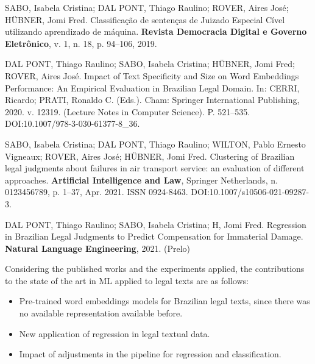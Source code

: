\begin{flushleft}

SABO, Isabela Cristina; DAL PONT, Thiago Raulino; ROVER, Aires José; HÜBNER, Jomi Fred. Classificação de sentenças de Juizado Especial Cível utilizando aprendizado de máquina. \textbf{Revista Democracia Digital e Governo Eletrônico}, v. 1, n. 18, p. 94–106, 2019.

\vspace{1em}

DAL PONT, Thiago Raulino; SABO, Isabela Cristina; HÜBNER, Jomi Fred; ROVER, Aires José. Impact of Text Specificity and Size on Word Embeddings Performance: An Empirical Evaluation in Brazilian Legal Domain. In: CERRI, Ricardo; PRATI, Ronaldo C. (Eds.). Cham: Springer International Publishing, 2020. v. 12319. (Lecture Notes in Computer Science). P. 521–535. DOI:10.1007/978-3-030-61377-8\_36. 

\vspace{1em}

SABO, Isabela Cristina; DAL PONT, Thiago Raulino; WILTON, Pablo Ernesto Vigneaux; ROVER, Aires José; HÜBNER, Jomi Fred. Clustering of Brazilian legal judgments about failures in air transport service: an evaluation of different approaches. \textbf{Artificial Intelligence and Law}, Springer Netherlands, n. 0123456789, p. 1–37, Apr. 2021. ISSN 0924-8463. DOI:10.1007/s10506-021-09287-3.

\vspace{1em}

DAL PONT, Thiago Raulino; SABO, Isabela Cristina; H, Jomi Fred. Regression in Brazilian Legal Judgments to Predict Compensation for Immaterial Damage. \textbf{Natural Language Engineering}, 2021. (Prelo) 
 
\end{flushleft}

Considering the published works and the experiments applied, the contributions to the state of the art in ML applied to legal texts are as follows:

\begin{itemize}[noitemsep]
    \item Pre-trained word embeddings models for Brazilian legal texts, since there was no available representation available before.
    \item New application of regression in legal textual data.
    \item Impact of adjustments in the pipeline for regression and classification.
    
\end{itemize}


